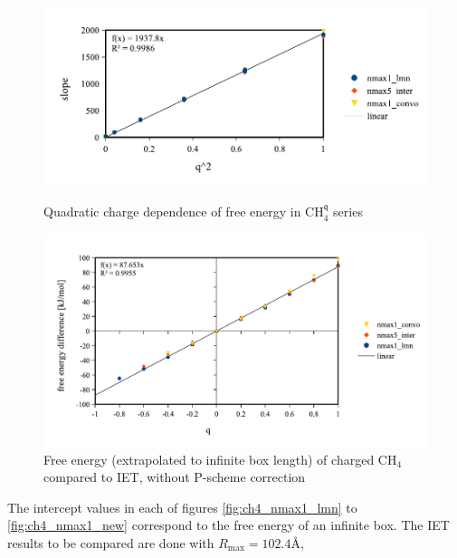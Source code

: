 \begin{figure}[!th]
\begin{centering}
\includegraphics[bb=0bp 20bp 425bp 178bp,scale=0.75]{_figure/results/ch4_slope}
\par\end{centering}
\caption{Quadratic charge dependence of free energy in $\mathrm{C}\mathrm{H}_{4}^{\mathfrak{q}}$
series\label{fig:Quadratic-charge-dependence}}

\begin{centering}
\vspace{0.33cm}
\includegraphics[bb=0bp 20bp 510bp 263bp,scale=0.75]{_figure/results/ch4_diff_energy}
\par\end{centering}
\caption[Free energy of charged $\mathrm{C}\mathrm{H}_{4}$ compared to \acs{IET},
without P-scheme correction]{Free energy (extrapolated to infinite box length) of charged $\mathrm{C}\mathrm{H}_{4}$
compared to \acs{IET}, without P-scheme correction\label{fig:Comparison-to-IET,without-correction}}
\end{figure}
The intercept values in each of figures \ref{fig:ch4_nmax1_lmn} to
\ref{fig:ch4_nmax1_new} correspond to the free energy of an infinite
box. The \acs{IET} results to be compared are done with $R_{\max}=102.4\textrm{Å}$,

